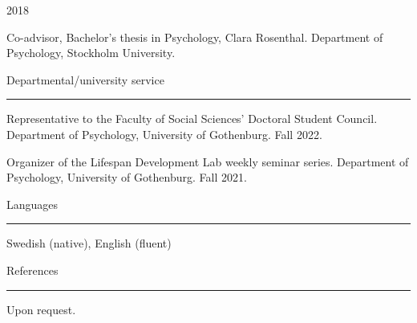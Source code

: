 \documentclass[10pt]{article}
\newcommand{\RR}{\textcolor{grayrule}{\rule[3mm]{\textwidth}{0.5pt}}}
\begin{document}
\begin{minipage}[t]{0.075\linewidth}
2018 
\end{minipage} 
\begin{minipage}[t]{0.92\linewidth}
Co-advisor, Bachelor's thesis in Psychology, Clara Rosenthal. Department of Psychology, Stockholm University. \vspace{\baselineskip}
\end{minipage}

{\large Departmental/university service} \\
\vspace{-.3cm}\RR 
\textbf{}


\begin{hangparas}{0.4in}{1}
Representative to the Faculty of Social Sciences’ Doctoral Student Council. Department of Psychology, University of Gothenburg. Fall 2022.

Organizer of the Lifespan Development Lab weekly seminar series. Department of Psychology, University of Gothenburg. Fall 2021.

\end{hangparas}

 \vspace{\baselineskip}





{\large Languages} \\
\vspace{-.3cm}\RR 

Swedish (native), English (fluent)
 \vspace{\baselineskip}


{\large References} \\
\vspace{-.3cm}\RR 

Upon request.
\end{document}
